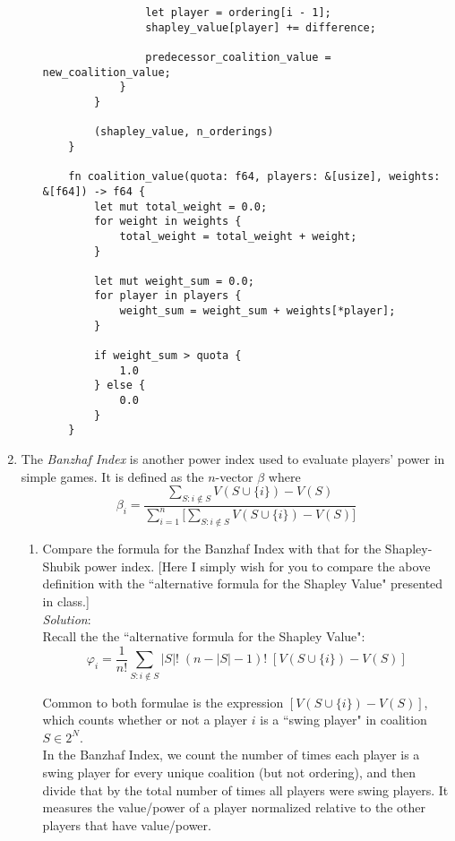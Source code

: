 \documentclass{article}
\begin{document}
\begin{enumerate}
\begin{enumerate}
\begin{verbatim}
                let player = ordering[i - 1];
                shapley_value[player] += difference;

                predecessor_coalition_value = new_coalition_value;
            }
        }

        (shapley_value, n_orderings)
    }

    fn coalition_value(quota: f64, players: &[usize], weights: &[f64]) -> f64 { 
        let mut total_weight = 0.0;
        for weight in weights {
            total_weight = total_weight + weight;
        }

        let mut weight_sum = 0.0;
        for player in players { 
            weight_sum = weight_sum + weights[*player];
        }

        if weight_sum > quota { 
            1.0
        } else { 
            0.0
        }
    }
  \end{verbatim}
  \end{enumerate}

%
\item The \emph{Banzhaf Index} is another power index used to evaluate players' power in simple games. It is defined as the $n$-vector $\beta$ where
\[ \beta_{i} = \frac{\sum_{S: i \not\in S}{V(S \cup \{i\}) - V(S)}}
                    {\sum_{i = 1}^{n}{[\sum_{S: i \not\in S}{V(S \cup \{i\}) - V(S)}}]} \]

  \begin{enumerate}
  \item Compare the formula for the Banzhaf Index with that for the Shapley-Shubik power index. [Here I simply wish for you to compare the above definition with the ``alternative formula for the Shapley Value" presented in class.] \\

  \textit{Solution}:\\

  Recall the the ``alternative formula for the Shapley Value":
  \[ \varphi_{i} = \frac{1}{n!} \sum_{S: i \not\in S}{|S|!\;(n - |S| - 1)!\;[V(S \cup \{i\}) - V(S)]} \]

  Common to both formulae is the expression $[V(S \cup \{i\}) - V(S)]$, which counts whether or not a player $i$ is a ``swing player" in coalition $S \in 2^{N}$. \\

  In the Banzhaf Index, we count the number of times each player is a swing player for every unique coalition (but not ordering), and then divide that by the total number of times all players were swing players. It measures the value/power of a player normalized relative to the other players that have value/power. \\


\end{enumerate}
\end{enumerate}
\end{document}
